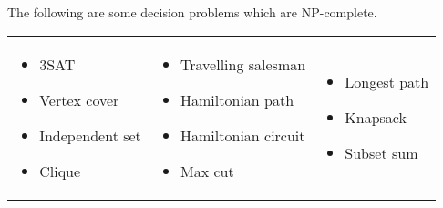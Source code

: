 \documentclass[10pt, oneside, reqno]{amsart}
\theoremstyle{plain}%
\theoremstyle{definition}
\theoremstyle{remark}
\begin{document}
The following are some decision problems which are NP-complete.
\linebreak
\begin{tabular}{p{2in}p{2in}p{2in}}
\begin{itemize}
\item 3SAT
\item Vertex cover
\item Independent set
\item Clique
\end{itemize}
&
\begin{itemize}
\item Travelling salesman
\item Hamiltonian path
\item Hamiltonian circuit
\item Max cut
\end{itemize}
&
\begin{itemize}
\item Longest path
\item Knapsack
\item Subset sum
\end{itemize}
\end{tabular}
\end{document}
